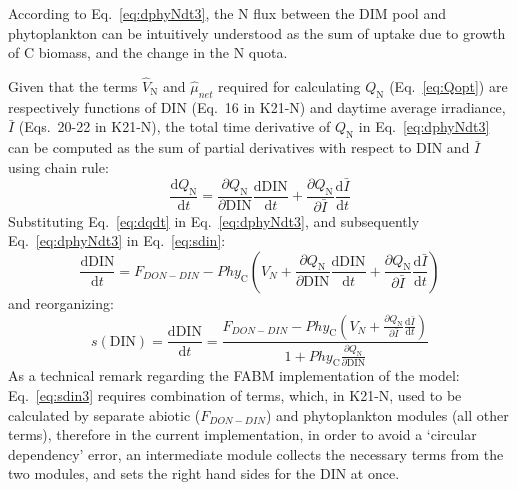 \documentclass[gmd, manuscript]{copernicus}
\begin{document}
According to Eq.~\ref{eq:dphyNdt3}, the N flux between the DIM pool and phytoplankton can be intuitively understood as the sum of uptake due to growth of C biomass, and the change in the N quota. %

Given that the terms $\hat{V}_\text{N}$ and $\hat{\mu}_{net}$ required for calculating $Q_\text{N}$ (Eq.~\ref{eq:Qopt}) are respectively functions of DIN (Eq.~16 in K21-N) and daytime average irradiance, $\bar{I}$ (Eqs.~20-22 in K21-N), the total time derivative of $Q_\text{N}$ in Eq.~\ref{eq:dphyNdt3} can be computed as the sum of partial derivatives with respect to DIN and $\bar{I}$ using chain rule: 
\begin{equation} \label{eq:dqdt}
 \frac{\text{d} Q_\text{N}}{\text{d} t} = \frac{\partial Q_\text{N}}{\partial \text{DIN}} \frac{\text{d} \text{DIN}}{\text{d} t} +  \frac{\partial Q_\text{N}}{\partial \bar{I}} \frac{\text{d} \bar{I}}{\text{d} t} 
\end{equation}
Substituting Eq.~\ref{eq:dqdt} in Eq.~\ref{eq:dphyNdt3}, and subsequently Eq.~\ref{eq:dphyNdt3} in Eq.~\ref{eq:sdin}:
\begin{equation}\label{eq:sdin2}
 \frac{\text{d}\text{DIN}}{\text{d}t} = F_{DON-DIN} - Phy_{\text{C}} \left(V_N + \frac{\partial Q_\text{N}}{\partial \text{DIN}} \frac{\text{d} \text{DIN}}{\text{d} t} +  \frac{\partial Q_\text{N}}{\partial \bar{I}} \frac{\text{d} \bar{I}}{\text{d} t} \right)
\end{equation}
and reorganizing:
\begin{equation}\label{eq:sdin3}
 s(\text{DIN}) = \frac{\text{d}\text{DIN}}{\text{d}t} = \frac{F_{DON-DIN} - Phy_{\text{C}} \left(V_N +  \frac{\partial Q_\text{N}}{\partial \bar{I}} \frac{\text{d} \bar{I}}{\text{d} t} \right)}{ 1+Phy_{\text{C}}\frac{\partial Q_\text{N}}{\partial \text{DIN}}}
\end{equation}
As a technical remark regarding the FABM implementation of the model: Eq.~\ref{eq:sdin3} requires combination of terms, which, in K21-N, used to be calculated by separate abiotic ($F_{DON-DIN}$) and phytoplankton modules (all other terms), therefore in the current implementation, in order to avoid a `circular dependency' error, an intermediate module collects the necessary terms from the two modules, and sets the right hand sides for the DIN at once.
\end{document}
